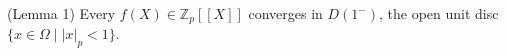 (Lemma 1) Every $f(X) \in \mathbb{Z}_p[[X]]$ converges in $D(1^-)$, the open unit disc $\{x \in \Omega \mid |x|_p < 1\}$.